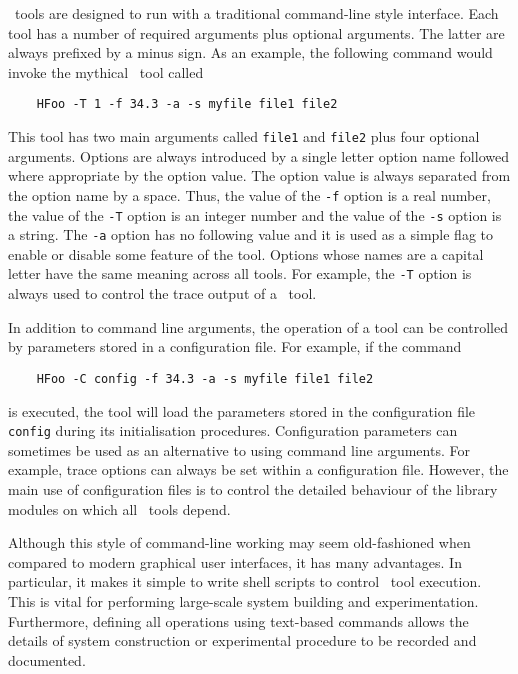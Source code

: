 \HTK\ tools are designed to run with a traditional command-line style interface.
Each tool
has a number of required arguments plus optional arguments.
The latter are always prefixed by a minus sign.  As an example,
the following command would invoke the mythical \HTK\ tool called
\begin{verbatim}
    HFoo -T 1 -f 34.3 -a -s myfile file1 file2
\end{verbatim}
This tool has two main arguments called \texttt{file1} and
\texttt{file2} plus four optional arguments.  Options
are always introduced by a single letter option name followed
where appropriate by the option value.  The option value
is always separated from the option name by a space. Thus, the value of the
\texttt{-f} option is a real number, the value of the
\texttt{-T} option is an integer number and the value of the
\texttt{-s} option is a string.  The \texttt{-a} option has no following
value and it is used as a simple flag to enable or disable some
feature of the tool.  Options whose names are a capital letter
have the same meaning across all tools.  For example, the \texttt{-T}
option is always used to control the trace output of a \HTK\ tool.

In addition to command line arguments, the operation of a tool
can be controlled by parameters stored 
in a configuration file.
For example, if the command 
\begin{verbatim}
    HFoo -C config -f 34.3 -a -s myfile file1 file2
\end{verbatim}
is executed, the tool  will load the 
parameters stored in the configuration
file \texttt{config} during its initialisation procedures.  
Configuration parameters can sometimes be used as an
alternative to using command line arguments.  For example, trace
options can always be set within a configuration file.  However, the
main use of configuration files is to control the detailed behaviour
of the library modules on which all \HTK\ tools depend.

Although this style of command-line 
working may seem old-fashioned when compared to modern
graphical user interfaces, it has many advantages.  In particular,
it makes it simple to write shell scripts to control \HTK\ tool execution.  This
is vital for performing large-scale system building and experimentation.
Furthermore, defining all operations using text-based commands allows
the details of system construction or experimental procedure to
be recorded and documented.

